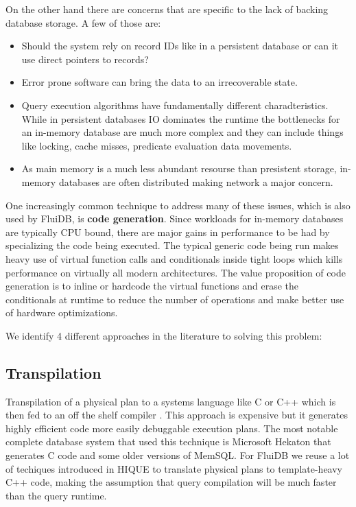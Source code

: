 On the other hand there are concerns that are specific to the lack of
backing database storage. A few of those are:

\begin{itemize}
\item Should the system rely on record IDs like in a persistent database
or can it use direct pointers to records?
\item Error prone software can bring the data to an irrecoverable state.
\item Query execution algorithms have fundamentally different
charadteristics. While in persistent databases IO dominates the
runtime the bottlenecks for an in-memory database are much more
complex and they can include things like locking, cache misses,
predicate evaluation data movements.
\item As main memory is a much less abundant resourse than presistent
storage, in-memory databases are often distributed making network a
major concern.
\end{itemize}

One increasingly common technique to address many of these issues,
which is also used by FluiDB, is \textbf{code generation}. Since workloads
for in-memory databases are typically CPU bound, there are major gains
in performance to be had by specializing the code being executed. The
typical generic code being run makes heavy use of virtual function
calls and conditionals inside tight loops which kills performance on
virtually all modern architectures. The value proposition of code
generation is to inline or hardcode the virtual functions and erase
the conditionals at runtime to reduce the number of operations and
make better use of hardware optimizations.

We identify 4 different approaches in the literature to solving this
problem:

\subsection{Transpilation}
\label{sec:orgbf8a953}

Transpilation of a physical plan to a systems language like C or C++
which is then fed to an off the shelf compiler
\cite{krikellasGeneratingCodeHolistic2010}. This approach is expensive
but it generates highly efficient code more easily debuggable
execution plans. The most notable complete database system that used
this technique is Microsoft Hekaton that generates C code and some
older versions of MemSQL. For FluiDB we reuse a lot of techiques
introduced in HIQUE \cite{krikellasGeneratingCodeHolistic2010} to
translate physical plans to template-heavy C++ code, making the
assumption that query compilation will be much faster than the query
runtime.

